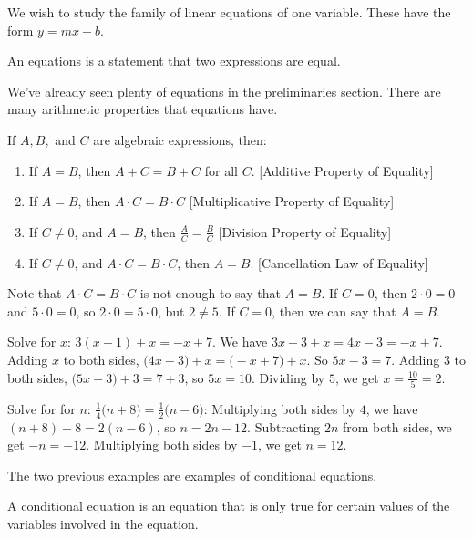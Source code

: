 \documentclass[crop=false,class=book,oneside]{standalone}                      %
\begin{document}
        We wish to study the family of linear equations of one variable. These have the form $y=mx+b$.
        \begin{definition}
        An equations is a statement that two expressions are equal.
        \end{definition}
        We've already seen plenty of equations in the preliminaries section. There are many arithmetic properties that equations have.
        \begin{properties}
        If $A,B,$ and $C$ are algebraic expressions, then:
        \begin{enumerate}
        \item If $A=B$, then $A+C=B+C$ for all $C$. \hfill [Additive Property of Equality]
        \item If $A=B$, then $A\cdot C = B\cdot C$ \hfill [Multiplicative Property of Equality]
        \item If $C \ne 0$, and $A=B$, then $\frac{A}{C} = \frac{B}{C}$ \hfill [Division Property of Equality]
        \item If $C\ne 0$, and $A\cdot C = B\cdot C$, then $A=B$. \hfill [Cancellation Law of Equality]
        \end{enumerate}
        \end{properties}
        \begin{remark}
        Note that $A\cdot C = B\cdot C$ is not enough to say that $A=B$. If $C = 0$, then $2\cdot 0 = 0$ and $5\cdot 0 = 0$, so $2\cdot 0 = 5\cdot 0$, but $2\ne 5$. If $C = 0$, then we can say that $A=B$.
        \end{remark}
        \begin{example}
        Solve for $x$: $3(x-1) +x = -x+7$. We have $3x-3+x = 4x-3 = -x+7$. Adding $x$ to both sides, $\big(4x-3)+x = \big(-x+7)+x$. So $5x-3 = 7$. Adding $3$ to both sides, $\big(5x-3\big)+3 = 7+3$, so $5x = 10$. Dividing by $5$, we get $x = \frac{10}{5} = 2$.
        \end{example}
        \begin{example}
        Solve for for $n$: $\frac{1}{4}\big(n+8\big) = \frac{1}{2}\big(n-6\big)$: Multiplying both sides by $4$, we have $(n+8)-8 = 2(n-6)$, so $n = 2n-12$. Subtracting $2n$ from both sides, we get $-n = -12$. Multiplying both sides by $-1$, we get $n=12$.
        \end{example}
        The two previous examples are examples of conditional equations.
        \begin{definition}
        A conditional equation is an equation that is only true for certain values of the variables involved in the equation.
        \end{definition}
\end{document}
